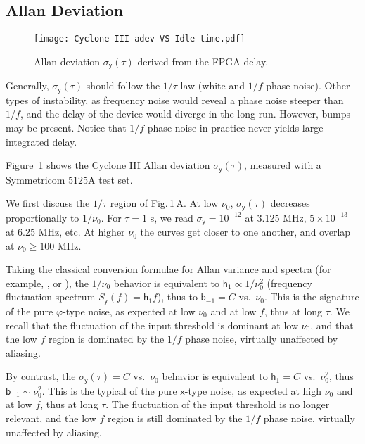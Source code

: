 \documentclass{article}
\begin{document}
\subsection{Allan Deviation}
\begin{figure}
\centering
\texttt{[image: Cyclone-III-adev-VS-Idle-time.pdf]}
\caption{Allan deviation $\sigma_\mathsf{y}(\tau)$ derived from the FPGA delay.}
\label{fig:Cyclone-III-adev-VS-dead-time}
\end{figure}

Generally, $\sigma_\mathsf{y}(\tau)$ should follow the $1/\tau$ law (white and $1/f$ phase noise).  Other types of instability, as frequency noise would reveal a phase noise steeper than $1/f$, and the delay of the device would diverge in the long run.  However, bumps may be present.
Notice that $1/f$ phase noise in practice never yields large integrated delay. 

Figure~\ref{fig:Cyclone-III-adev-VS-dead-time} shows
the Cyclone III Allan deviation $\sigma_\mathsf{y}(\tau)$, measured with a Symmetricom 5125A test set.

We first discuss the $1/\tau$ region of Fig.\,\ref{fig:Cyclone-III-adev-VS-dead-time}\,A\@.  
At low $\nu_0$, $\sigma_\mathsf{y}(\tau)$ decreases proportionally to $1/\nu_0$.  
For $\tau=1$ s, we read $\sigma_\mathsf{y}=10^{-12}$ at 3.125 MHz, $5{\times}10^{-13}$ at 6.25 MHz, etc. 
At higher $\nu_0$ the curves get closer to one another, and overlap at $\nu_0\ge100$ MHz.


Taking the classical conversion formulae for Allan variance and spectra (for example, \cite[P.\,77--80]{Kroupa-1983}, or \cite{IEEE-STD-1139-2008}), 
the $1/\nu_0$ behavior is equivalent to $\mathsf{h}_{1}\propto1/\nu_0^2$ (frequency fluctuation spectrum $S_\mathsf{y}(f)=\mathsf{h}_{1}f$), thus to $\mathsf{b}_{-1}=C$ vs.\ $\nu_0$.  
This is the signature of the pure $\varphi$-type noise, as expected at low $\nu_0$ and at low $f$, thus at long $\tau$.
We recall that the fluctuation of the input threshold is dominant at low $\nu_0$, and that the low $f$ region is dominated by the $1/f$ phase noise, virtually unaffected by aliasing.

By contrast, the $\sigma_\mathsf{y}(\tau)=C$ vs.\ $\nu_0$ behavior is equivalent to $\mathsf{h}_{1}=C$ vs.\ $\nu_0^2$, thus $\mathsf{b}_{-1}\sim\nu_0^2$.  This is the typical of the pure $\mathsf{x}$-type noise, as expected at high $\nu_0$ and at low $f$, thus at long $\tau$.
The fluctuation of the input threshold is no longer relevant, and the low $f$ region is still dominated by the $1/f$ phase noise, virtually unaffected by aliasing.
\end{document}
